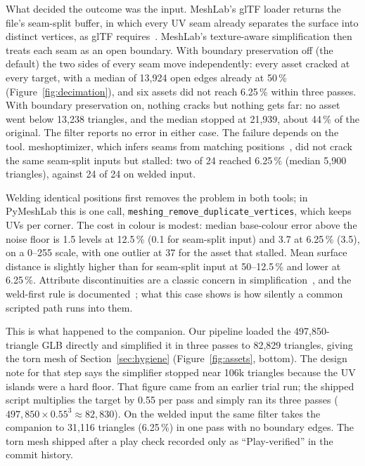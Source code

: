 What decided the outcome was the input. MeshLab's glTF loader returns the
file's seam-split buffer, in which every UV seam already separates the surface
into distinct vertices, as glTF requires~\cite{khronos2021gltf}. MeshLab's
texture-aware simplification then treats each seam as an open boundary. With
boundary preservation off (the default) the two sides of every seam move
independently: every asset cracked at every target, with a median of 13,924 open
edges already at 50\,\% (Figure~\ref{fig:decimation}), and six assets did not
reach 6.25\,\% within three passes. With boundary preservation on, nothing cracks
but nothing gets far: no asset went below 13,238 triangles, and the median stopped
at 21,939, about 44\,\% of the original. The filter reports no error in either
case. The failure depends on the tool. meshoptimizer, which infers seams from
matching positions~\cite{meshopt}, did not crack the same seam-split inputs but
stalled: two of 24 reached 6.25\,\% (median 5,900 triangles), against 24 of 24 on
welded input.

Welding identical positions first removes the problem in both tools; in
PyMeshLab this is one call, \texttt{meshing\_remove\_\allowbreak duplicate\_\allowbreak vertices},
which keeps UVs per corner. The
cost in colour is modest: median base-colour error above the noise floor is
1.5 levels at 12.5\,\% (0.1 for seam-split input) and 3.7 at 6.25\,\% (3.5), on a
0--255 scale, with one outlier at 37 for the asset that stalled. Mean surface
distance is slightly higher than for seam-split input at 50--12.5\,\% and lower at
6.25\,\%. Attribute discontinuities are a classic concern in
simplification~\cite{hoppe1996pm,hoppe1999newqem}, and the weld-first rule is
documented~\cite{meshopt}; what this case shows is how silently a common scripted
path runs into them.

This is what happened to the companion. Our pipeline loaded the 497,850-triangle
GLB directly and simplified it in three passes to 82,829 triangles, giving the
torn mesh of Section~\ref{sec:hygiene} (Figure~\ref{fig:assets}, bottom). The
design note for that step says the simplifier stopped near 106k triangles
because the UV islands were a hard floor. That figure came from an earlier trial
run; the shipped script multiplies the target by 0.55 per pass and simply ran its
three passes ($497{,}850 \times 0.55^3 \approx 82{,}830$). On the welded input the
same filter takes the companion to 31,116 triangles (6.25\,\%) in one pass with
no boundary edges. The torn mesh shipped after a play check recorded only as
``Play-verified'' in the commit history.
